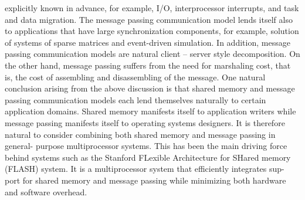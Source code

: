 \documentclass[11pt]{article}
\begin{document}
explicitly known in advance, for example, I/O, interprocessor interrupts, and task
and data migration. The message passing communication model lends itself also
to applications that have large synchronization components, for example, solution
of systems of sparse matrices and event-driven simulation. In addition, message
passing communication models are natural client – server style decomposition. On
the other hand, message passing suffers from the need for marshaling cost, that
is, the cost of assembling and disassembling of the message.
One natural conclusion arising from the above discussion is that shared memory
and message passing communication models each lend themselves naturally to
certain application domains. Shared memory manifests itself to application writers
while message passing manifests itself to operating systems designers. It is therefore
natural to consider combining both shared memory and message passing in general-
purpose multiprocessor systems. This has been the main driving force behind
systems such as the Stanford FLexible Architecture for SHared memory (FLASH)
system. It is a multiprocessor system that efficiently integrates sup-
port for shared memory and message passing while minimizing both hardware and
software overhead.




\end{document}
